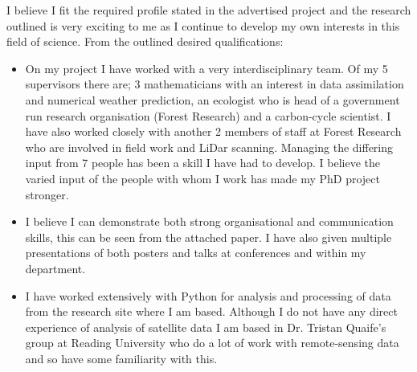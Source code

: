 \documentclass[11pt]{article}
\begin{document}
I believe I fit the required profile stated in the advertised project and the research outlined is very exciting to me as I continue to develop my own interests in this field of science. From the outlined desired qualifications:
\begin{itemize}
\item On my project I have worked with a very interdisciplinary team. Of my 5 supervisors there are; 3 mathematicians with an interest in data assimilation and numerical weather prediction, an ecologist who is head of a government run research organisation (Forest Research) and a carbon-cycle scientist. I have also worked closely with another 2 members of staff at Forest Research who are involved in field work and LiDar scanning. Managing the differing input from 7 people has been a skill I have had to develop. I believe the varied input of the people with whom I work has made my PhD project stronger.
\item I believe I can demonstrate both strong organisational and communication skills, this can be seen from the attached paper. I have also given multiple presentations of both posters and talks at conferences and within my department. 
\item I have worked extensively with Python for analysis and processing of data from the research site where I am based. Although I do not have any direct experience of analysis of satellite data I am based in Dr. Tristan Quaife's group at Reading University who do a lot of work with remote-sensing data and so have some familiarity with this. 
\end{itemize}
{}
\end{document}
